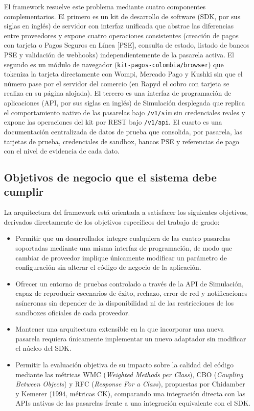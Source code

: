 El framework resuelve este problema mediante cuatro componentes complementarios. El primero es un kit de desarrollo de software (SDK, por sus siglas en inglés) de servidor con interfaz unificada que abstrae las diferencias entre proveedores y expone cuatro operaciones consistentes (creación de pagos con tarjeta o Pagos Seguros en Línea [PSE], consulta de estado, listado de bancos PSE y validación de webhooks) independientemente de la pasarela activa. El segundo es un módulo de navegador (\texttt{kit-pagos-colombia/browser}) que tokeniza la tarjeta directamente con Wompi, Mercado Pago y Kushki sin que el número pase por el servidor del comercio (en Rapyd el cobro con tarjeta se realiza en su página alojada). El tercero es una interfaz de programación de aplicaciones (API, por sus siglas en inglés) de Simulación desplegada que replica el comportamiento nativo de las pasarelas bajo \texttt{/v1/sim} sin credenciales reales y expone las operaciones del kit por REST bajo \texttt{/v1/api}. El cuarto es una documentación centralizada de datos de prueba que consolida, por pasarela, las tarjetas de prueba, credenciales de sandbox, bancos PSE y referencias de pago con el nivel de evidencia de cada dato.

\subsection{Objetivos de negocio que el sistema debe cumplir}
La arquitectura del framework está orientada a satisfacer los siguientes objetivos, derivados directamente de los objetivos específicos del trabajo de grado:

\begin{itemize}
    \item Permitir que un desarrollador integre cualquiera de las cuatro pasarelas soportadas mediante una misma interfaz de programación, de modo que cambiar de proveedor implique únicamente modificar un parámetro de configuración sin alterar el código de negocio de la aplicación.
    \item Ofrecer un entorno de pruebas controlado a través de la API de Simulación, capaz de reproducir escenarios de éxito, rechazo, error de red y notificaciones asíncronas sin depender de la disponibilidad ni de las restricciones de los sandboxes oficiales de cada proveedor.
    \item Mantener una arquitectura extensible en la que incorporar una nueva pasarela requiera únicamente implementar un nuevo adaptador sin modificar el núcleo del SDK.
    \item Permitir la evaluación objetiva de su impacto sobre la calidad del código mediante las métricas WMC (\textit{Weighted Methods per Class}), CBO (\textit{Coupling Between Objects}) y RFC (\textit{Response For a Class}), propuestas por Chidamber y Kemerer (1994, métricas CK), comparando una integración directa con las APIs nativas de las pasarelas frente a una integración equivalente con el SDK.
\end{itemize}

